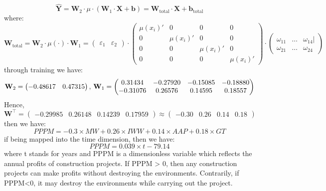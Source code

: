 \documentclass[12pt]{article}
\begin{document}
\begin{equation}
	\hat{\textbf{Y}}=\textbf{W}_2\cdot\mu\cdot(\textbf{W}_1\cdot\textbf{X}+\textbf{b})=\textbf{W}_{\text{total}}\cdot\textbf{X}+\textbf{b}_{\text{total}}
\end{equation}
where:
\begin{equation}
	\textbf{W}_{\text{total}}=\textbf{W}_2\cdot\mu(\cdot)\cdot\textbf{W}_1=\begin{pmatrix}
		\varepsilon_{1} & \varepsilon_{2}
	\end{pmatrix}\cdot\begin{pmatrix}
	\mu(x_i)' & 0 & 0 & 0 \\
	0 &\mu(x_i)'  &0 & 0 \\
	0  & 0 &\mu(x_i)' &0 \\
	0 & 0 & 0 & \mu(x_i)'
	\end{pmatrix}\cdot\begin{pmatrix}
		\omega_{11} & \dots & \omega_{14}| \\
	\omega_{21} &  \dots & \omega_{24}
	\end{pmatrix}
\end{equation}
through training we have:
\begin{equation}	\textbf{W}_2=
\begin{pmatrix}
	-0.48617& 0.47315
\end{pmatrix},\hspace{0.2em}\textbf{W}_1 =\begin{pmatrix}
	0.31434 & -0.27920 & -0.15085 & -0.18880 \\
	-0.31076 & 0.26576 & 0.14595 & 0.18557 
\end{pmatrix}
\end{equation}
Hence, 
\begin{equation}
\textbf{W}^{\top} = \begin{pmatrix}
	-0.29985 & 0.26148 & 0.14239 & 0.17959
\end{pmatrix}\approx\begin{pmatrix}
-0.30 & 0.26 & 0.14 & 0.18
\end{pmatrix}
\end{equation}
then we have:
\begin{equation}
	PPPM = -0.3\times MW + 0.26\times IWW + 0.14\times AAP + 0.18\times GT
\end{equation}
if being mapped into the time dimension, then we have:
\begin{equation}
	PPPM = 0.039\times t -79.14
\end{equation}
where t stands for years and PPPM is a dimensionless variable which reflects the annual profits of construction projects. If PPPM > 0, then any construction projects can make profits without destroying the environments. Contrarily, if PPPM<0, it may destroy the environments while carrying out the project.
\end{document}
